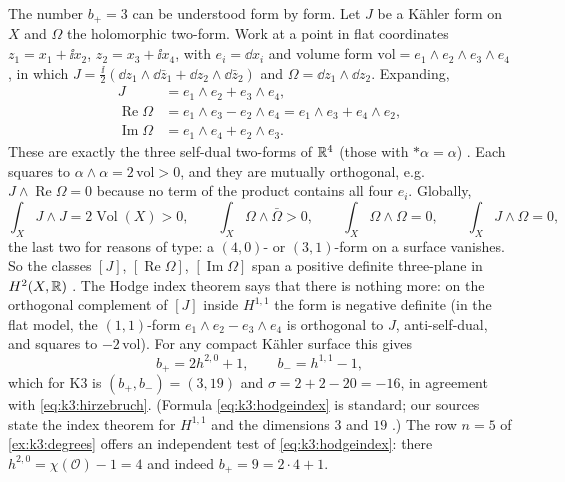 The number $b_+=3$ can be understood form by form. Let $J$ be a Kähler form on $X$ and
$\Omega$ the holomorphic two-form. Work at a point in flat coordinates $z_1=x_1+\ii x_2$,
$z_2=x_3+\ii x_4$, with $e_i=\dd x_i$ and volume form $\mathrm{vol}=e_1\wedge e_2\wedge
e_3\wedge e_4$, in which $J=\frac{\ii}{2}(\dd z_1\wedge\dd\bar z_1+\dd z_2\wedge\dd\bar z_2)$
and $\Omega=\dd z_1\wedge\dd z_2$. Expanding,
\begin{equation}\label{eq:k3:sdforms}
\begin{aligned}
  J&=e_1\wedge e_2+e_3\wedge e_4,\\
  \operatorname{Re}\Omega&=e_1\wedge e_3-e_2\wedge e_4=e_1\wedge e_3+e_4\wedge e_2,\\
  \operatorname{Im}\Omega&=e_1\wedge e_4+e_2\wedge e_3 .
\end{aligned}
\end{equation}
These are exactly the three self-dual two-forms of $\mathbb{R}^4$ (those with $*\alpha=\alpha$)
. Each squares to $\alpha\wedge\alpha=2\,
\mathrm{vol}>0$, and they are mutually orthogonal, e.g.\ $J\wedge\operatorname{Re}\Omega=0$
because no term of the product contains all four $e_i$. Globally,
\begin{equation}
  \int_XJ\wedge J=2\operatorname{Vol}(X)>0,\qquad
  \int_X\Omega\wedge\bar\Omega>0,\qquad \int_X\Omega\wedge\Omega=0,\qquad
  \int_XJ\wedge\Omega=0,
\end{equation}
the last two for reasons of type: a $(4,0)$- or $(3,1)$-form on a surface vanishes. So the
classes $[J]$, $[\operatorname{Re}\Omega]$, $[\operatorname{Im}\Omega]$ span a positive
definite three-plane in $H^2(X,\mathbb{R})$ . The Hodge index
theorem says that there is nothing more: on the orthogonal
complement of $[J]$ inside $H^{1,1}$ the form is negative definite (in the flat model, the
$(1,1)$-form $e_1\wedge e_2-e_3\wedge e_4$ is orthogonal to $J$, anti-self-dual, and squares to
$-2\,\mathrm{vol}$). For any compact Kähler surface this gives
\begin{equation}\label{eq:k3:hodgeindex}
  b_+=2h^{2,0}+1,\qquad b_-=h^{1,1}-1,
\end{equation}
which for K3 is $(b_+,b_-)=(3,19)$ and $\sigma=2+2-20=-16$, in agreement with
\eqref{eq:k3:hirzebruch}. (Formula \eqref{eq:k3:hodgeindex} is standard; our sources state the index theorem for
$H^{1,1}$  and the dimensions $3$ and $19$
.) The row
$n=5$ of \cref{ex:k3:degrees} offers an independent test of \eqref{eq:k3:hodgeindex}: there
$h^{2,0}=\chi(\mathcal{O})-1=4$ and indeed $b_+=9=2\cdot4+1$.

